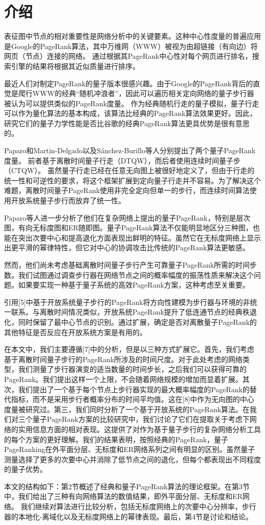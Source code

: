 \section{介绍}
表征图中节点的相对重要性是网络分析中的关键要素。这种中心性度量的普遍应用是Google的PageRank算法，其中万维网（WWW）被视为由超链接（有向边）将网页（节点）连接的网络。 通过根据其PageRank中心性对每个网页进行排名，搜索引擎的结果将根据其近似质量进行排序。

最近人们对制定PageRank的量子版本很感兴趣。由于Google的PageRank背后的直觉是爬行WWW的经典“随机冲浪者”，因此可以遍历相关定向网络的量子步行器被认为可以提供类似的PageRank度量。 作为经典随机行走的量子模拟，量子行走可以作为量化算法的基本构成，该算法比经典的PageRank算法效果更好。因此，研究它们的量子力学性能是否比谷歌的经典PageRank算法更具优势是很有意思的。

Paparo和Martin-Delgado以及Sánchez-Burillo等人分别提出了两个量子PageRank度量。 前者基于离散时间量子行走（DTQW），而后者使用连续时间量子步（CTQW）。 虽然量子行走已经在任意无向图上被很好地定义了，但由于行走的统一性和可逆性的要求，将这个框架扩展到定向量子行走并不容易。为了解决这个难题，离散时间量子PageRank使用非完全定向但单一的步行，而连续时间算法使用开放系统量子步行而放弃了统一性。

Paparo等人进一步分析了他们在复杂网络上提出的量子PageRank，特别是层次图，有向无标度图和ER随即图。量子PageRank算法不仅能明显地区分三种图，也能在突出次要中心和提高退化方面表现出鲜明的特征。虽然它在无标度网络上显示出更平滑的幂律特性，但它对中心的协调攻击比传统的PageRank算法更敏感。

然而，他们尚未考虑基础离散时间量子步行产生可靠量子PageRank所需的时间步数。我们试图通过调查步行器在网络节点之间的概率幅度的振荡性质来解决这个问题。如果要实现一种基于量子系统的高效PageRank方案，这种考虑至关重要。

引用[5]中基于开放系统量子步行的PageRank将方向性建模为步行器与环境的非统一联系。与离散时间情况类似，开放系统PageRank提升了低连通节点的经典秩退化，同时保留了最中心节点的识别。通过扩展，确定是否对离散量子PageRank的其他特征是否反应在开放系统方案是有用的。

在本文中，我们主要遵循[7]中的分析，但是以三种方式扩展它。首先，我们考虑基于离散时间量子步行的PageRank所涉及的时间尺度。对于此处考虑的网络类型，我们测量了步行器演变的适当数量的时间步长，之后我们可以获得可靠的PageRank。我们提出这样一个上限，不会随着网络规模的增加而显着扩展。其次，我们提出了一个基于每个节点上步行器实现的最大概率幅度的PageRank的替代指标，而不是采用步行者概率分布的时间平均值。这在[8]中作为无向图的中心度量被研究过。第三，我们同时分析了一个基于开放系统的PageRank算法。在我们对三个量子PageRank方案的比较研究中，我们讨论了它们在提取关于考虑下网络的实用信息方面的相对表现。这提供了对作为基于量子步行的复杂网络分析工具的每个方案的更好理解。我们的结果表明，按照经典的PageRank，量子PageRanking在外平面分层、无标度和ER网络系列之间有明显的区别。虽然量子测量选择了更多的次要中心并消除了低节点之间的退化，但每个都表现出不同程度的量子优势。

本文的结构如下：第2节概述了经典和量子PageRank算法的理论框架。在第3节中，我们给出了三种有向网络算法的数值结果，即外平面分层、无标度和ER网络。 我们继续对算法进行比较分析，包括无标度网络上的次要中心分辨率，步行器的本地化-离域化以及无标度网络上的幂律表现。最后，第4节是讨论和结论。
